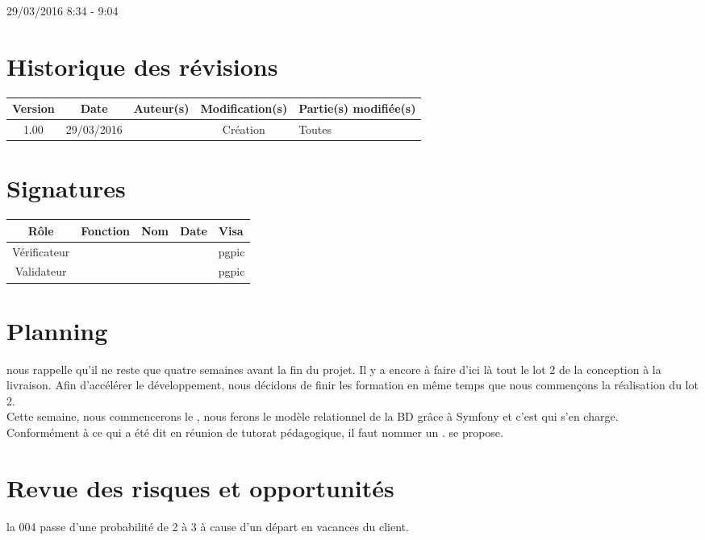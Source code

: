 \documentclass [a4paper] {article}
\begin{document}
29/03/2016			 				%
\hfill   
\hfill 	 8:34 - 9:04 				%



\section*{Historique des révisions}
\begin{center}
			\begin{tabular}{| c | c | c | c | p{4cm} |}
				\hline
				\rowcolor{Gray}
				Version & Date & Auteur(s) & Modification(s) & Partie(s) modifiée(s)		 \\
				\hline
				1.00 & 29/03/2016 & \Pierre & Création & Toutes \\
		\hline		
			\end{tabular}
		\end{center}

\section*{Signatures}

		\begin{center}
			\begin{tabular}{| c | c | c | c | p{4cm} |}
				\hline
				\rowcolor{Gray}
				Rôle & Fonction & Nom & Date & Visa		 \\
				\hline
				Vérificateur & \RQA & \Kafui &  & pgpic \\[30pt]
				\hline
				Validateur & \CP & \Sergi &  & pgpic \\[30pt]	
				\hline
			\end{tabular}
		\end{center}
		
\newpage		



\section{Planning}
\Sergi{} nous rappelle qu'il ne reste que quatre semaines avant la fin du projet. Il y a encore à faire d'ici là tout le lot 2 de la conception à la livraison. Afin d’accélérer le développement, nous décidons de finir les formation en même temps que nous commençons la réalisation du lot 2. \\
Cette semaine, nous commencerons le \DCP{}, nous ferons le modèle relationnel de la BD grâce à Symfony et c'est \Kafui{} qui s'en charge. \\
Conformément à ce qui a été dit en réunion de tutorat pédagogique, il faut nommer un \RS{}. \Florian se propose.


\section{Revue des risques et opportunités}

la \FDR{}004 passe d'une probabilité de 2 à 3 à cause d'un départ en vacances du client.




\end{document}
